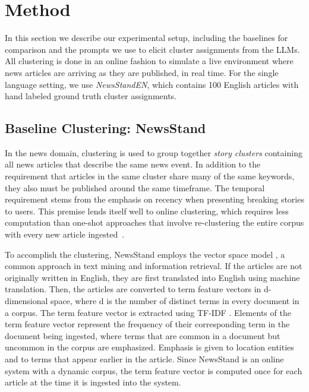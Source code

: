 \section{Method}\label{section:method}

In this section we describe our experimental setup, including the baselines for comparison and the prompts we use to elicit cluster assignments from the LLMs.
All clustering is done in an online fashion to simulate a live environment where news articles are arriving as they are published, in real time.
For the single language setting, we use \emph{NewsStandEN}, which contains 100 English articles with hand labeled ground truth cluster assignments.


\subsection{Baseline Clustering: NewsStand}
In the news domain, clustering is used to group together \emph{story clusters} containing all news articles that describe the same news event. 
In addition to the requirement that articles in the same cluster share many of the same keywords, they also must be published around the same timeframe. 
The temporal requirement stems from the emphasis on recency when presenting breaking stories to users. 
This premise lends itself well to online clustering, which requires less computation than one-shot approaches that involve re-clustering the entire corpus with every new article ingested~\cite{Teit08}.

To accomplish the clustering, NewsStand employs the vector space model \cite{salton}, a common approach in text mining and information retrieval. 
If the articles are not originally written in English, they are first translated into English using machine translation.
Then, the articles are converted to term feature vectors in d-dimensional space, where d is the number of distinct terms in every document in a corpus. 
The term feature vector is extracted using TF-IDF \cite{salton-buckley}. 
Elements of the term feature vector represent the frequency of their corresponding term in the document being ingested, where terms that are common in a document but uncommon in the corpus are emphasized. 
Emphasis is given to location entities and to terms that appear earlier in the article. 
Since NewsStand is an online system with a dynamic corpus, the term feature vector is computed once for each article at the time it is ingested into the system.

